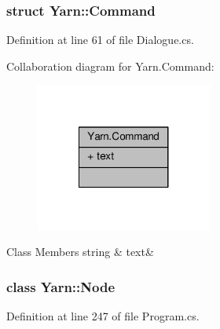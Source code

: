 \subsubsection{struct Yarn\-:\-:Command}


Definition at line 61 of file Dialogue.\-cs.



Collaboration diagram for Yarn.\-Command\-:
\nopagebreak
\begin{figure}[H]
\begin{center}
\leavevmode
\includegraphics[width=164pt]{a00392}
\end{center}
\end{figure}
\begin{DoxyFields}{Class Members}
\hypertarget{a00051_a8564e5104566e145f5d917ec846444d9}{string}\label{a00051_a8564e5104566e145f5d917ec846444d9}
&
text&
\\
\hline

\end{DoxyFields}
\label{a00379}
\hypertarget{a00051_a00379}{}
\subsubsection{class Yarn\-:\-:Node}


Definition at line 247 of file Program.\-cs.



